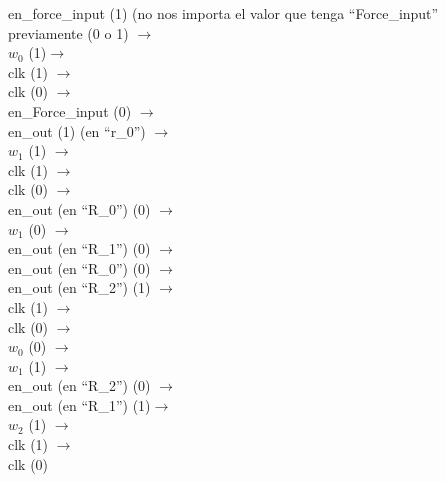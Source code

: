 \documentclass{article}
\begin{document}
\begin{enumerate}
    en\_force\_input (1) (no nos importa el valor que tenga “Force\_input” previamente (0 o 1) $\rightarrow$\\
    $w_0$ (1)$\rightarrow$\\
    clk (1) $\rightarrow$\\
    clk (0) $\rightarrow$\\
    en\_Force\_input (0) $\rightarrow$\\
    en\_out (1) (en “r\_0”) $\rightarrow$\\
    $w_1$ (1)  $\rightarrow$\\
    clk (1) $\rightarrow$\\
    clk (0) $\rightarrow$\\
    en\_out (en “R\_0”) (0) $\rightarrow$\\
    $w_1$ (0) $\rightarrow$\\
    en\_out (en “R\_1”) (0) $\rightarrow$\\
    en\_out (en “R\_0”) (0) $\rightarrow$\\
    en\_out (en “R\_2”) (1) $\rightarrow$\\
    clk (1) $\rightarrow$\\ clk (0) $\rightarrow$\\
    $w_0$ (0) $\rightarrow$\\
    $w_1$ (1) $\rightarrow$\\
    en\_out (en “R\_2”) (0) $\rightarrow$\\
    en\_out (en “R\_1”) (1)$\rightarrow$\\
    $w_2$ (1) $\rightarrow$\\
    clk (1) $\rightarrow$\\
    clk (0)
\end{enumerate}
\newpage
\end{document}
